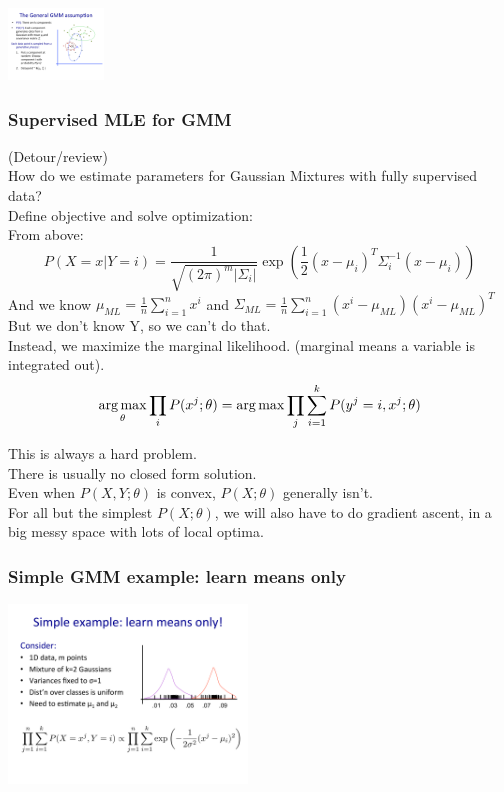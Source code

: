 \includegraphics[width=1.0in]{figures/GMM_cartoon.pdf}

\subsubsection{Supervised MLE for GMM}
(Detour/review) \hfill \\

How do we estimate parameters for Gaussian Mixtures with fully supervised data? \hfill \\
Define objective and solve optimization: \hfill \\
From above: 
$$ P(X=x | Y=i) = \frac{1}{\sqrt{(2 \pi)^m | \Sigma_i |}} \exp \left(  \frac{1}{2}(x - \mu_i)^T \Sigma_i^{-1} (x- \mu_i) \right) $$
And we know $ \displaystyle \mu_{ML} = \frac{1}{n} \sum_{i=1}^n x^i$ and $ \displaystyle \Sigma_{ML} = \frac{1}{n} \sum_{i=1}^n (x^i - \mu_{ML}) (x^i - \mu_{ML})^T$ \hfill \\

But we don't know Y, so we can't do that.  \hfill \\

Instead, we maximize the marginal likelihood.  (marginal means a variable is integrated out).
$$ \operatorname*{arg\,max}_{\theta} \prod_i P(x^j; \theta) = \operatorname*{arg\,max} \prod_j \sum_{i=1}^k P(y^j=i, x^j; \theta) $$

This is always a hard problem.  \hfill \\
There is usually no closed form solution.  \hfill \\
Even when $P(X, Y; \theta)$ is convex, $P(X; \theta)$ generally isn't.  \hfill \\
For all but the simplest  $P(X; \theta)$, we will also have to do gradient ascent, in a big messy space with lots of local optima.   \hfill \\

\subsubsection{Simple GMM example: learn means only}
\includegraphics[width=2.5in]{figures/gmm_for_means_only.pdf}

